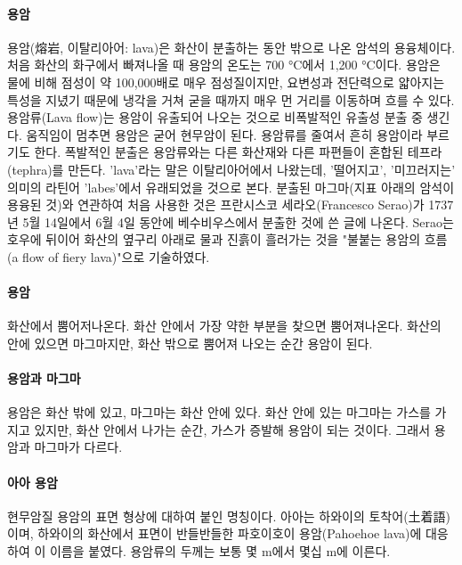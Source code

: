 \documentclass[12pt, a4paper, twoside]{book}
\begin{document}
		\paragraph{용암}
			용암(熔岩, 이탈리아어: lava)은 화산이 분출하는 동안 밖으로 나온 암석의 용융체이다. 
			처음 화산의 화구에서 빠져나올 때 용암의 온도는 700 °C에서 1,200 °C이다. 
			용암은 물에 비해 점성이 약 100,000배로 매우 점성질이지만, 요변성과 전단력으로 얇아지는 특성을 지녔기 때문에 냉각을 거쳐 굳을 때까지 매우 먼 거리를 이동하며 흐를 수 있다. 
			용암류(Lava flow)는 용암이 유출되어 나오는 것으로 비폭발적인 유출성 분출 중 생긴다. 
			움직임이 멈추면 용암은 굳어 현무암이 된다. 
			용암류를 줄여서 흔히 용암이라 부르기도 한다. 
			폭발적인 분출은 용암류와는 다른 화산재와 다른 파편들이 혼합된 테프라(tephra)를 만든다. 
			'lava'라는 말은 이탈리아어에서 나왔는데, '떨어지고', '미끄러지는' 의미의 라틴어 'labes'에서 유래되었을 것으로 본다. 
			분출된 마그마(지표 아래의 암석이 용융된 것)와 연관하여 처음 사용한 것은 프란시스코 세라오(Francesco Serao)가 1737년 5월 14일에서 6월 4일 동안에 베수비우스에서 분출한 것에 쓴 글에 나온다. 
			Serao는 호우에 뒤이어 화산의 옆구리 아래로 물과 진흙이 흘러가는 것을 "불붙는 용암의 흐름(a flow of fiery lava)"으로 기술하였다.

		\paragraph{용암}
			화산에서 뿜어저나온다. 
			화산 안에서 가장 약한 부분을 찾으면 뿜어져나온다. 
			화산의 안에 있으면 마그마지만, 화산 밖으로 뿜어져 나오는 순간 용암이 된다.

		\paragraph{용암과 마그마}
			용암은 화산 밖에 있고, 마그마는 화산 안에 있다. 
			화산 안에 있는 마그마는 가스를 가지고 있지만, 화산 안에서 나가는 순간, 가스가 증발해 용암이 되는 것이다. 
			그래서 용암과 마그마가 다르다.

		\paragraph{아아 용암}
			현무암질 용암의 표면 형상에 대하여 붙인 명칭이다. 
			아아는 하와이의 토착어(土着語)이며, 하와이의 화산에서 표면이 반들반들한 파호이호이 용암(Pahoehoe lava)에 대응하여 이 이름을 붙였다. 
			용암류의 두께는 보통 몇 m에서 몇십 m에 이른다.



	
\end{document}

